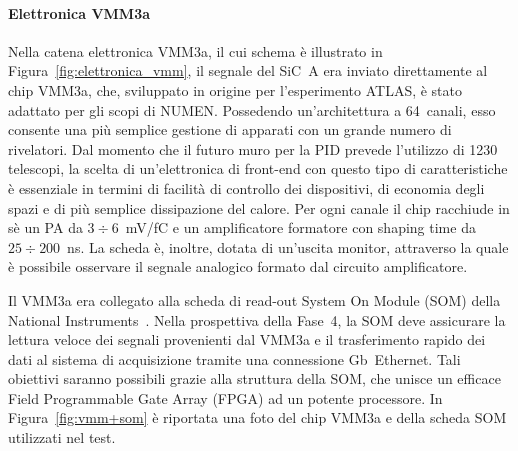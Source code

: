 

\paragraph{Elettronica VMM3a} 
%
Nella catena elettronica VMM3a, il cui schema è illustrato in Figura~\ref{fig:elettronica_vmm}, il segnale del SiC~A era inviato direttamente al chip VMM3a, che, sviluppato in origine per l'esperimento ATLAS, è stato adattato per gli scopi di NUMEN.
Possedendo un'architettura a 64~canali, esso consente una più semplice gestione di apparati con un grande numero di rivelatori.
%
%
Dal momento che il futuro muro per la PID prevede l'utilizzo di 1230 telescopi, la scelta di un'elettronica di front-end con questo tipo di caratteristiche è essenziale in termini di facilità di controllo dei dispositivi, di economia degli spazi e di più semplice dissipazione del calore.
Per ogni canale il chip racchiude in sè un PA da $3 \div 6$~mV/fC e un amplificatore formatore con shaping time da $25 \div 200$~ns.
La scheda è, inoltre, dotata di un'uscita monitor, attraverso la quale è possibile osservare il segnale analogico formato dal circuito amplificatore.

Il VMM3a era collegato alla scheda di read-out System On Module (SOM) della National Instruments~\cite{national_instruments}.
Nella prospettiva della Fase~4, la SOM deve assicurare la lettura veloce dei segnali provenienti dal VMM3a e il trasferimento rapido dei dati al sistema di acquisizione tramite una connessione Gb~Ethernet.
Tali obiettivi saranno possibili grazie alla struttura della SOM, che unisce un efficace Field Programmable Gate Array (FPGA) ad un potente processore.
In Figura~\ref{fig:vmm+som} è riportata una foto del chip VMM3a e della scheda SOM utilizzati nel test.

